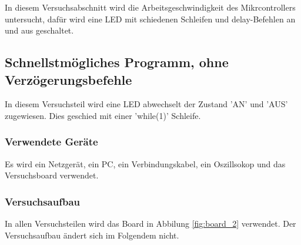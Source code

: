 \documentclass[12pt,a4paper]{article}
\begin{document}
In diesem Versuchsabschnitt wird die Arbeitsgeschwindigkeit des Mikrcontrollers untersucht, dafür wird eine LED mit schiedenen Schleifen und delay-Befehlen an und aus geschaltet.

\subsection{Schnellstmögliches Programm, ohne Verzögerungsbefehle}

In diesem Versuchsteil wird eine LED abwechselt der Zustand 'AN' und 'AUS' zugewiesen. Dies geschied mit einer 'while(1)' Schleife.

\subsubsection*{Verwendete Geräte}

Es wird ein Netzgerät, ein PC, ein Verbindungskabel, ein Oszillsokop und das Versuchsboard verwendet.

\subsubsection*{Versuchsaufbau}

In allen Versuchsteilen wird das Board in Abbilung \ref{fig:board_2} verwendet. Der Versuchsaufbau ändert sich im Folgendem nicht.
\end{document}
